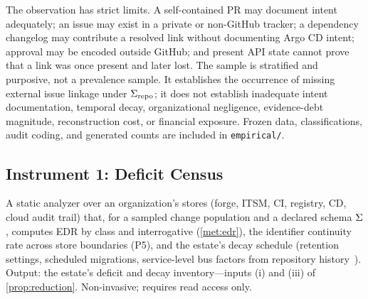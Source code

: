 The observation has strict limits. A self-contained PR may document intent
adequately; an issue may exist in a private or non-GitHub tracker; a dependency
changelog may contribute a resolved link without documenting Argo CD intent;
approval may be encoded outside GitHub; and present API state cannot prove that a
link was once present and later lost. The sample is stratified and purposive, not a
prevalence sample. It establishes the occurrence of missing external issue linkage
under $\Sigma_{\mathrm{repo}}$; it does not establish inadequate intent
documentation, temporal decay, organizational negligence, evidence-debt magnitude,
reconstruction cost, or financial exposure. Frozen data, classifications, audit
coding, and generated counts are included in \texttt{empirical/}.

\subsection{Instrument 1: Deficit Census}
A static analyzer over an organization's stores (forge, ITSM, CI, registry, CD,
cloud audit trail) that, for a sampled change population and a declared schema
$\Sigma$, computes EDR by class and interrogative (\cref{met:edr}), the identifier
continuity rate across store boundaries (P5), and the estate's decay schedule
(retention settings, scheduled migrations, service-level bus factors from
repository history~\cite{avelino2016}). Output: the estate's deficit and decay
inventory---inputs (i) and (iii) of \cref{prop:reduction}. Non-invasive; requires
read access only.

